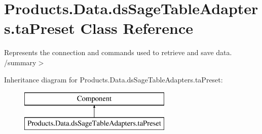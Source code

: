 \hypertarget{class_products_1_1_data_1_1ds_sage_table_adapters_1_1ta_preset}{}\section{Products.\+Data.\+ds\+Sage\+Table\+Adapters.\+ta\+Preset Class Reference}
\label{class_products_1_1_data_1_1ds_sage_table_adapters_1_1ta_preset}


Represents the connection and commands used to retrieve and save data. /summary$>$  


Inheritance diagram for Products.\+Data.\+ds\+Sage\+Table\+Adapters.\+ta\+Preset\+:\begin{figure}[H]
\begin{center}
\leavevmode
\includegraphics[height=2.000000cm]{class_products_1_1_data_1_1ds_sage_table_adapters_1_1ta_preset}
\end{center}
\end{figure}

